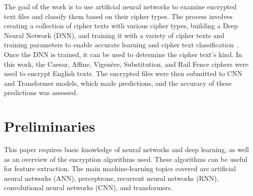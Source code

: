 \documentclass[runningheads]{llncs}
\begin{document}
The goal of the work is to use artificial neural networks to examine encrypted text files and classify them based on their cipher types. The process involves creating a collection of cipher texts with various cipher types, building a Deep Neural Network (DNN), and training it with a variety of cipher texts and training parameters to enable accurate learning and cipher text classification~\cite{inproceedings}. Once the DNN is trained, it can be used to determine the cipher text's kind. In this work, the Caesar, Affine, Vigenère, Substitution, and Rail Fence ciphers were used to encrypt English texts. The encrypted files were then submitted to CNN and Transformer models, which made predictions, and the accuracy of these predictions was assessed.

\section{Preliminaries}
This paper requires basic knowledge of neural networks and deep learning, as well as an overview of the encryption algorithms used. These algorithms can be useful for feature extraction. The main machine-learning topics covered are artificial neural networks (ANN), perceptrons, recurrent neural networks (RNN), convolutional neural networks (CNN), and transformers.
\end{document}

